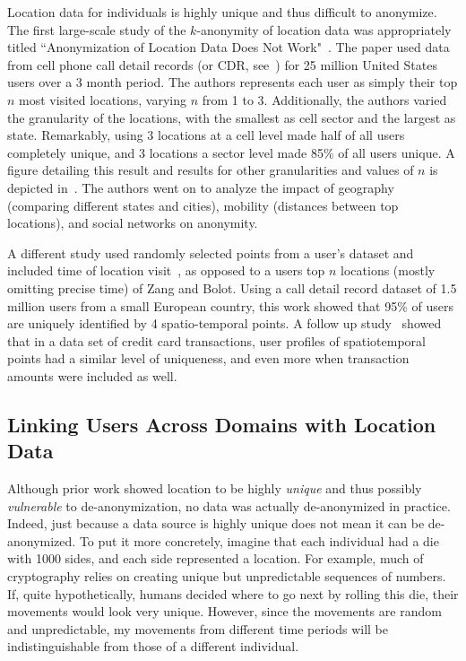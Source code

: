 Location data for individuals is highly unique and thus difficult to anonymize.
The first large-scale study of the $k$-anonymity of location data was appropriately titled ``Anonymization of Location Data Does Not Work"~\cite{Zang:2011hk}.
The paper used data from cell phone call detail records (or CDR, see~) for 25 million United States users over a 3 month period.
The authors represents each user as simply their top $n$ most visited locations, varying $n$ from 1 to 3.
Additionally, the authors varied the granularity of the locations, with the smallest as cell sector and the largest as state.
Remarkably, using 3 locations at a cell level made half of all users completely unique, and 3 locations a sector level made 85\% of all users unique.
A figure detailing this result and results for other granularities and values of $n$ is depicted in~.
The authors went on to analyze the impact of geography (comparing different states and cities), mobility (distances between top locations), and social networks on anonymity.

A different study used randomly selected points from a user's dataset and included time of location visit~\cite{de2013unique}, as opposed to a users top $n$ locations (mostly omitting precise time) of Zang and Bolot.
Using a call detail record dataset of 1.5 million users from a small European country, this work showed that 95\% of users are uniquely identified by 4 spatio-temporal points.
A follow up study~\cite{de2015unique} showed that in a data set of credit card transactions, user profiles of spatiotemporal points had a similar level of uniqueness, and even more when transaction amounts were included as well.


\subsection{Linking Users Across Domains with Location Data}
Although prior work showed location to be highly \emph{unique} and thus possibly \emph{vulnerable} to de-anonymization, no data was actually de-anonymized in practice.
Indeed, just because a data source is highly unique does not mean it can be de-anonymized.
To put it more concretely, imagine that each individual had a die with 1000 sides, and each side represented a location.
For example, much of cryptography relies on creating unique but unpredictable sequences of numbers.
If, quite hypothetically, humans decided where to go next by rolling this die, their movements would look very unique.
However, since the movements are random and unpredictable, my movements from different time periods will be indistinguishable from those of a different individual.

